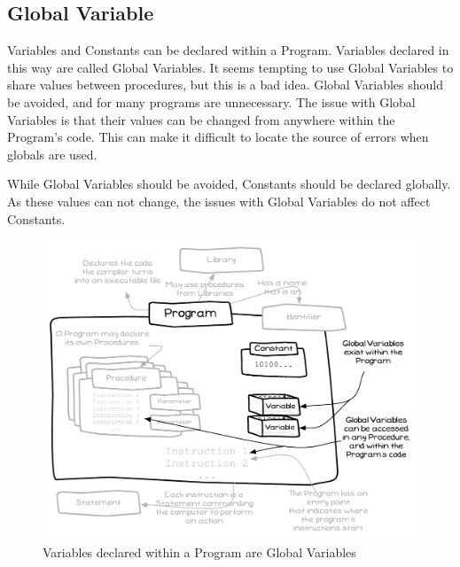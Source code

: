 \clearpage
\subsection{Global Variable} %
\label{sub:global_variable}

Variables and Constants can be declared within a Program. Variables declared in this way are called Global Variables. It seems tempting to use Global Variables to share values between procedures, but this is a bad idea. Global Variables should be avoided, and for many programs are unnecessary. The issue with Global Variables is that their values can be changed from anywhere within the Program's code. This can make it difficult to locate the source of errors when globals are used.

While Global Variables should be avoided, Constants should be declared globally. As these values can not change, the issues with Global Variables do not affect Constants. 

\begin{figure}[h]
   \centering
   \includegraphics[width=\textwidth]{./topics/storing-using-data/diagrams/GlobalVariables} 
   \caption{Variables declared within a Program are Global Variables}
   \label{fig:storing-using-data-local-variables}
\end{figure}

